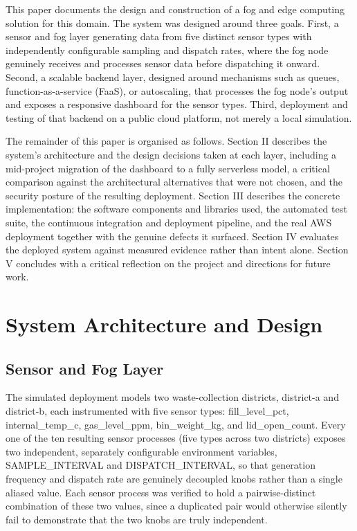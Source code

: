 \documentclass[conference]{IEEEtran}
\begin{document}
This paper documents the design and construction of a fog and edge computing solution for this domain. The system was designed around three goals. First, a sensor and fog layer generating data from five distinct sensor types with independently configurable sampling and dispatch rates, where the fog node genuinely receives and processes sensor data before dispatching it onward. Second, a scalable backend layer, designed around mechanisms such as queues, function-as-a-service (FaaS), or autoscaling, that processes the fog node's output and exposes a responsive dashboard for the sensor types. Third, deployment and testing of that backend on a public cloud platform, not merely a local simulation.

The remainder of this paper is organised as follows. Section II describes the system's architecture and the design decisions taken at each layer, including a mid-project migration of the dashboard to a fully serverless model, a critical comparison against the architectural alternatives that were not chosen, and the security posture of the resulting deployment. Section III describes the concrete implementation: the software components and libraries used, the automated test suite, the continuous integration and deployment pipeline, and the real AWS deployment together with the genuine defects it surfaced. Section IV evaluates the deployed system against measured evidence rather than intent alone. Section V concludes with a critical reflection on the project and directions for future work.

\section{System Architecture and Design}

\subsection{Sensor and Fog Layer}
The simulated deployment models two waste-collection districts, district-a and district-b, each instrumented with five sensor types: fill\_level\_pct, internal\_temp\_c, gas\_level\_ppm, bin\_weight\_kg, and lid\_open\_count. Every one of the ten resulting sensor processes (five types across two districts) exposes two independent, separately configurable environment variables, SAMPLE\_INTERVAL and DISPATCH\_INTERVAL, so that generation frequency and dispatch rate are genuinely decoupled knobs rather than a single aliased value. Each sensor process was verified to hold a pairwise-distinct combination of these two values, since a duplicated pair would otherwise silently fail to demonstrate that the two knobs are truly independent.
\end{document}

